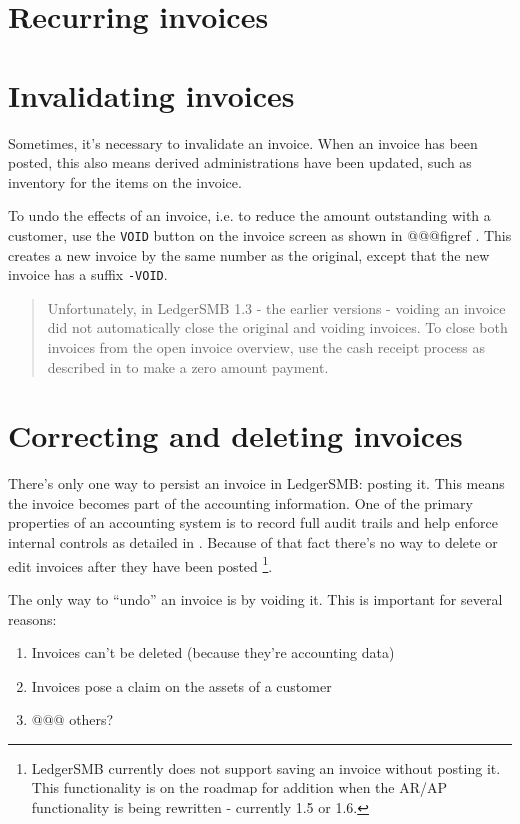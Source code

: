 \section{Recurring invoices}



\section{Invalidating invoices}

Sometimes, it's necessary to invalidate an invoice. When an invoice has been
posted, this also means derived administrations have been updated, such as
inventory for the items on the invoice.

To undo the effects of an invoice, i.e. to reduce the amount outstanding with a
customer, use the \texttt{VOID} button on the invoice screen as shown in @@@figref .
This creates a new invoice by the same number as the original, except that the new
invoice has a suffix \texttt{-VOID}.

\begin{quotation}
Unfortunately, in LedgerSMB 1.3 - the earlier versions - voiding an invoice did not
automatically close the original and voiding invoices.  To close both invoices from
the open invoice overview, use the cash receipt process as described in
 to make a zero amount payment.
\end{quotation}

\section{Correcting and deleting invoices}
\label{sec:CorrectingInvoices}

There's only one way to persist an invoice in LedgerSMB: posting it. This means
the invoice becomes part of the accounting information. One of the primary
properties of an accounting system is to record full audit trails and help enforce
internal controls as detailed in . Because
of that fact there's no way to delete or edit invoices after they have been posted
\footnote{LedgerSMB currently does not support saving an invoice without posting
it. This functionality is on the roadmap for addition when the AR/AP functionality
is being rewritten - currently 1.5 or 1.6.}.

The only way to ``undo'' an invoice is by voiding it. This is important for several
reasons:

\begin{enumerate}
\item Invoices can't be deleted (because they're accounting data)
\item Invoices pose a claim on the assets of a customer
\label{item:InvoicesAsClaims}
\item @@@ others?
\end{enumerate}

